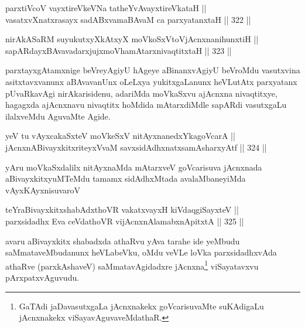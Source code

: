 \begin{shl}
parxtiVcoV vayxtireVkeVNa tatheYvAvayxtireVkataH || \\
vasatxvXnatxrasayx sadABxvamaBAvaM ca parxyatanxtaH ||  322 ||  
\end{shl}

\begin{shl}
nirAkASaRM suyukutxyXkAtxyX moVkoSxV\s toV\s jAcnxnanihunxtiH || \\
sapARdayxBAvavadarxjujxmoVhamAtarxnivaqtitxtaH ||  323 ||  
\end{shl}

\begin{artha}
parxtayxgAtamxnige beVreyAgiyU hAgeye aBinanxvAgiyU beVroMdu
vasutxvina asitxtavxvanunx aBAvavanUnx oLeLxya yukitxgaLanunx
heVLutAtx parxyatanx pUvaRkavAgi nirAkarisidenu, adariMda moVkaSxvu
ajAcnxna nivaqtitxye, hagagxda ajAcnxnavu nivaqtitx hoMdida
mAtarxdiMdle sapARdi vasutxgaLu ilalxveMdu AguvaMte Agide.
\end{artha}


\begin{shl}
yeV tu vAyxcakaSxteV moVkeSxV nitAyxnanedxYkagoVcarA || \\
jAcnxnABivayxkitxriteyxVvaM savxsidAdhxnatxsamAsharxyAtf ||  324 ||  
\end{shl}

\begin{artha}
yAru moVkaSxdalilx nitAyxnaMda mAtarxveV goVcarisuva jAcnxnada
aBivayxkitxyuMTeMdu tamamx sidAdhxMtada avalaMbaneyiMda vAyxKAyxnisuvaroV
\end{artha}

\begin{shl}
teYraBivayxkitxshabAdxthoVR vakatxvayxH kiVdaqgiSayxteV || \\
parxsidadhx Eva ceVdathoVR vijAcnxnAlamabxnApitxtA ||  325 ||  
\end{shl}

\begin{artha}
avaru aBivayxkitx shabadxda athaRvu yAva tarahe ide yeMbudu
saMmataveMbudanunx heVLabeVku, oMdu veVLe loVka parxsidadhxvAda
athaRve (parxkAshaveV) saMmatavAgidadxre jAcnxna\footnote{GaTAdi
jaDavasutxgaLa jAcnxnakekx goVcarisuvaMte suKAdigaLu jAcnxnakekx
viSayavAguvaveMdathaR.} viSayatavxvu pArxpatxvAguvudu.
\end{artha}


